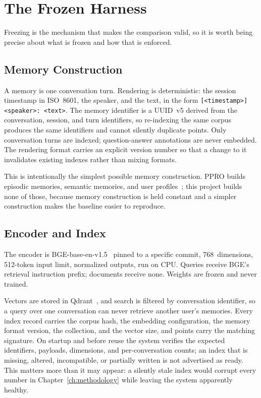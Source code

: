 \documentclass[12pt,letterpaper,oneside]{report}
\newcommand{\code}[1]{\texttt{\small #1}}
\begin{document}
\section{The Frozen Harness}
\label{sec:frozen}

Freezing is the mechanism that makes the comparison valid, so it is worth being
precise about what is frozen and how that is enforced.

\subsection{Memory Construction}

A memory is one conversation turn. Rendering is deterministic: the session
timestamp in ISO~8601, the speaker, and the text, in the form
\code{[<timestamp>] <speaker>: <text>}. The memory identifier is a UUID~v5
derived from the conversation, session, and turn identifiers, so re-indexing
the same corpus produces the same identifiers and cannot silently duplicate
points. Only conversation turns are indexed; question-answer annotations are
never embedded. The rendering format carries an explicit version number so that
a change to it invalidates existing indexes rather than mixing formats.

This is intentionally the simplest possible memory construction. PPRO builds
episodic memories, semantic memories, and user profiles~\cite{ppro}; this
project builds none of those, because memory construction is held constant and
a simpler construction makes the baseline easier to reproduce.

\subsection{Encoder and Index}

The encoder is BGE-base-en-v1.5~\cite{bge} pinned to a specific commit,
768~dimensions, 512-token input limit, normalized outputs, run on CPU. Queries
receive BGE's retrieval instruction prefix; documents receive none. Weights are
frozen and never trained.

Vectors are stored in Qdrant~\cite{qdrant}, and search is filtered by
conversation identifier, so a query over one conversation can never retrieve
another user's memories. Every index record carries the corpus hash, the
embedding configuration, the memory format version, the collection, and the
vector size, and points carry the matching signature. On startup and before
reuse the system verifies the expected identifiers, payloads, dimensions, and
per-conversation counts; an index that is missing, altered, incompatible, or
partially written is not advertised as ready. This matters more than it may
appear: a silently stale index would corrupt every number in
Chapter~\ref{ch:methodology} while leaving the system apparently healthy.
\end{document}
